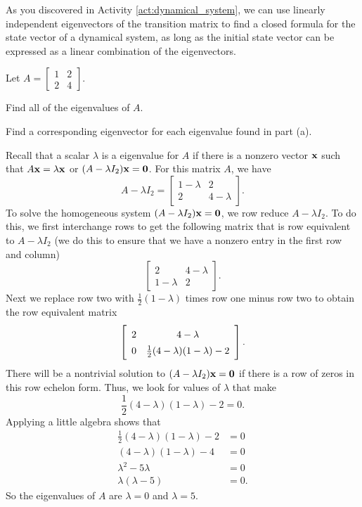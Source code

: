 \begin{activity}
\ea

\end{activity}

As you discovered in Activity \ref{act:dynamical_system}, we can use linearly independent eigenvectors of the transition matrix to find a closed formula for the state vector of a dynamical system, as long as the initial state vector can be expressed as a linear combination of the eigenvectors.



\ExampleIntro

\begin{example} Let $A = \left[ \begin{array}{cc} 1&2\\2&4 \end{array} \right]$.
	\ba
	\item Find all of the eigenvalues of $A$.
	
	\item Find a corresponding eigenvector for each eigenvalue found in part (a).  
	
	\ea


\ExampleSolution
\ba

\item Recall that a scalar $\lambda$ is a eigenvalue for $A$ if there is a nonzero vector $\mathbf{x}$ such that $A \mathbf{x} = \lambda \mathbf{x}$ or $(A-\lambda I_2) \mathbf{x} = \mathbf{0}$. For this matrix $A$, we have 
\[A - \lambda I_2 = \left[ \begin{array}{cc} 1-\lambda&2\\2&4-\lambda \end{array} \right].\]
To solve the homogeneous system $(A-\lambda I_2) \mathbf{x} = \mathbf{0}$, we row reduce $A - \lambda I_2$. To do this, we first interchange rows to get the following matrix that is row equivalent to $A - \lambda I_2$ (we do this to ensure that we have a nonzero entry in the first row and column)
\[\left[ \begin{array}{cc} 2&4-\lambda \\ 1-\lambda&2 \end{array} \right].\]
Next we replace row two with $\frac{1}{2}(1-\lambda)$ times row one minus row two to obtain the row equivalent matrix
\[\left[ \renewcommand{\arraystretch}{1.4} \begin{array}{cc} 2&4-\lambda \\ 0&\frac{1}{2}(4-\lambda)(1-\lambda)-2 \\ \end{array} \right].\]
There will be a nontrivial solution to $(A-\lambda I_2)\mathbf{x} = \mathbf{0}$ if there is a row of zeros in this row echelon form. Thus, we look for values of $\lambda$ that make 
\[\frac{1}{2}(4-\lambda)(1-\lambda)-2 = 0.\]
Applying a little algebra shows that 
\begin{align*}
\frac{1}{2}(4-\lambda)(1-\lambda)-2 &= 0 \\
(4-\lambda)(1-\lambda) - 4 &= 0 \\
\lambda^2 - 5 \lambda &= 0 \\
\lambda(\lambda-5) &= 0.
\end{align*}
So the eigenvalues of $A$ are $\lambda = 0$ and $\lambda = 5$. 


\end{example}
